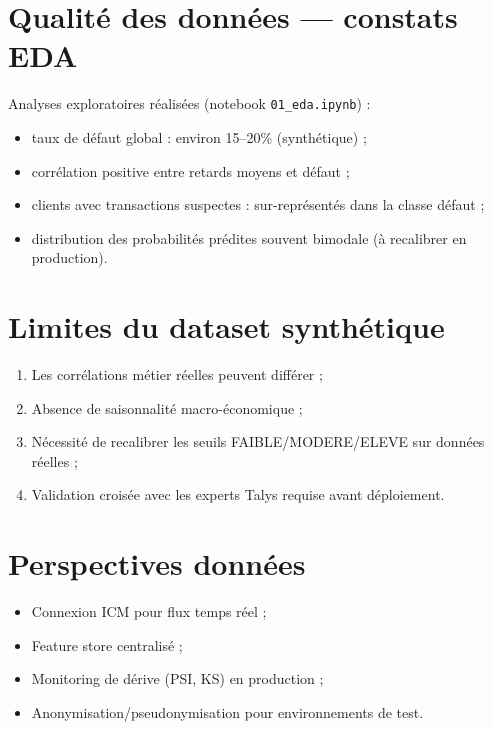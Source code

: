 \section{Qualité des données — constats EDA}

Analyses exploratoires réalisées (notebook \texttt{01\_eda.ipynb}) :
\begin{itemize}[leftmargin=*]
  \item taux de défaut global : environ 15--20\% (synthétique) ;
  \item corrélation positive entre retards moyens et défaut ;
  \item clients avec transactions suspectes : sur-représentés dans la classe défaut ;
  \item distribution des probabilités prédites souvent bimodale (à recalibrer en production).
\end{itemize}

\section{Limites du dataset synthétique}

\begin{enumerate}[leftmargin=*]
  \item Les corrélations métier réelles peuvent différer ;
  \item Absence de saisonnalité macro-économique ;
  \item Nécessité de recalibrer les seuils FAIBLE/MODERE/ELEVE sur données réelles ;
  \item Validation croisée avec les experts Talys requise avant déploiement.
\end{enumerate}

\section{Perspectives données}

\begin{itemize}[leftmargin=*]
  \item Connexion ICM pour flux temps réel ;
  \item Feature store centralisé ;
  \item Monitoring de dérive (PSI, KS) en production ;
  \item Anonymisation/pseudonymisation pour environnements de test.
\end{itemize}
